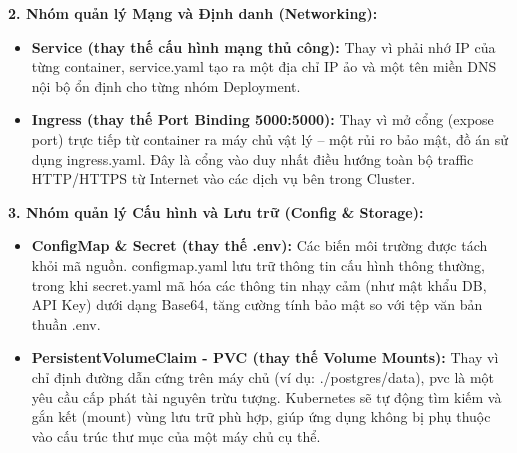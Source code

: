 \textbf{2. Nhóm quản lý Mạng và Định danh (Networking):} \begin{itemize} 
    \item \textbf{Service (thay thế cấu hình mạng thủ công):} Thay vì phải nhớ IP của từng container, service.yaml tạo ra một địa chỉ IP ảo và một tên miền DNS nội bộ ổn định cho từng nhóm Deployment. 
    \item \textbf{Ingress (thay thế Port Binding 5000:5000):} Thay vì mở cổng (expose port) trực tiếp từ container ra máy chủ vật lý – một rủi ro bảo mật, đồ án sử dụng ingress.yaml. Đây là cổng vào duy nhất điều hướng toàn bộ traffic HTTP/HTTPS từ Internet vào các dịch vụ bên trong Cluster. 
\end{itemize}

\textbf{3. Nhóm quản lý Cấu hình và Lưu trữ (Config \& Storage):} 
\begin{itemize} 
    \item \textbf{ConfigMap \& Secret (thay thế .env):} Các biến môi trường được tách khỏi mã nguồn. configmap.yaml lưu trữ thông tin cấu hình thông thường, trong khi secret.yaml mã hóa các thông tin nhạy cảm (như mật khẩu DB, API Key) dưới dạng Base64, tăng cường tính bảo mật so với tệp văn bản thuần .env. 
    \item \textbf{PersistentVolumeClaim - PVC (thay thế Volume Mounts):} Thay vì chỉ định đường dẫn cứng trên máy chủ (ví dụ: ./postgres/data), pvc là một yêu cầu cấp phát tài nguyên trừu tượng. Kubernetes sẽ tự động tìm kiếm và gắn kết (mount) vùng lưu trữ phù hợp, giúp ứng dụng không bị phụ thuộc vào cấu trúc thư mục của một máy chủ cụ thể. 
\end{itemize}


